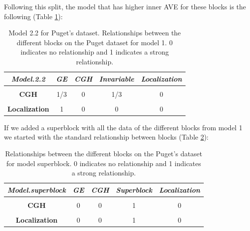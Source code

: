 \documentclass[
  12pt,
  a4paper,
  twoside,
  openright]{book}
\begin{document}
Following this split, the model that has higher inner AVE for these blocks is the following (Table \ref{tab:puget-model2-2}):

\begin{table}[H]

\caption[Model 2.2 for Puget's dataset.]{\label{tab:puget-model2-2}Model 2.2 for Puget's dataset. Relationships between the different blocks on the Puget dataset for model 1. 0 indicates no relationship and 1 indicates a strong relationship.}
\centering
\begin{tabular}[t]{|>{}c|c|c|c|>{}c|}
\hline
\em{\textbf{Model.2.2}} & \em{\textbf{GE}} & \em{\textbf{CGH}} & \em{\textbf{Invariable}} & \em{\textbf{Localization}}\\
\hline
\textbf{\cellcolor{gray!6}{GE}} & \cellcolor{gray!6}{1} & \cellcolor{gray!6}{1/3} & \cellcolor{gray!6}{0} & \cellcolor{gray!6}{1}\\
\hline
\textbf{CGH} & 1/3 & 0 & 1/3 & 0\\
\hline
\textbf{\cellcolor{gray!6}{Invariable}} & \cellcolor{gray!6}{0} & \cellcolor{gray!6}{1/3} & \cellcolor{gray!6}{0} & \cellcolor{gray!6}{0}\\
\hline
\textbf{Localization} & 1 & 0 & 0 & 0\\
\hline
\end{tabular}
\end{table}

If we added a superblock with all the data of the different blocks from model 1 we started with the standard relationship between blocks (Table \ref{tab:puget-model-superblock}):

\begin{table}[H]

\caption[Model with superblock for Puget's dataset.]{\label{tab:puget-model-superblock}Relationships between the different blocks on the Puget's dataset for model superblock. 0 indicates no relationship and 1 indicates a strong relationship.}
\centering
\begin{tabular}[t]{|>{}c|c|c|c|>{}c|}
\hline
\em{\textbf{Model.superblock}} & \em{\textbf{GE}} & \em{\textbf{CGH}} & \em{\textbf{Superblock}} & \em{\textbf{Localization}}\\
\hline
\textbf{\cellcolor{gray!6}{GE}} & \cellcolor{gray!6}{0} & \cellcolor{gray!6}{0} & \cellcolor{gray!6}{1} & \cellcolor{gray!6}{0}\\
\hline
\textbf{CGH} & 0 & 0 & 1 & 0\\
\hline
\textbf{\cellcolor{gray!6}{Superblock}} & \cellcolor{gray!6}{1} & \cellcolor{gray!6}{1} & \cellcolor{gray!6}{0} & \cellcolor{gray!6}{1}\\
\hline
\textbf{Localization} & 0 & 0 & 1 & 0\\
\hline
\end{tabular}
\end{table}
\end{document}
